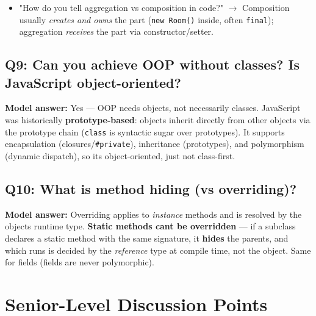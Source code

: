 \documentclass[11pt]{article}
\providecommand{\tightlist}{\setlength{\itemsep}{1pt}\setlength{\parskip}{0pt}}
\begin{document}
\begin{itemize}
\tightlist
\item
  "How do you tell aggregation vs composition in code?" \(\rightarrow\) Composition usually \emph{creates and owns} the part (\texttt{new\ Room()} inside, often \texttt{final}); aggregation \emph{receives} the part via constructor/setter.
\end{itemize}

\subsection{Q9: Can you achieve OOP without classes? Is JavaScript object-oriented?}\label{q9-can-you-achieve-oop-without-classes-is-javascript-object-oriented}

\textbf{Model answer:} Yes --- OOP needs objects, not necessarily classes. JavaScript was historically \textbf{prototype-based}: objects inherit directly from other objects via the prototype chain (\texttt{class} is syntactic sugar over prototypes). It supports encapsulation (closures/\texttt{\#private}), inheritance (prototypes), and polymorphism (dynamic dispatch), so it\textquotesingle s object-oriented, just not class-first.

\subsection{Q10: What is method hiding (vs overriding)?}\label{q10-what-is-method-hiding-vs-overriding}

\textbf{Model answer:} Overriding applies to \emph{instance} methods and is resolved by the object\textquotesingle s runtime type. \textbf{Static methods can\textquotesingle t be overridden} --- if a subclass declares a static method with the same signature, it \textbf{hides} the parent\textquotesingle s, and which runs is decided by the \emph{reference} type at compile time, not the object. Same for fields (fields are never polymorphic).

\section{Senior-Level Discussion Points}\label{senior-level-discussion-points}
\end{document}
